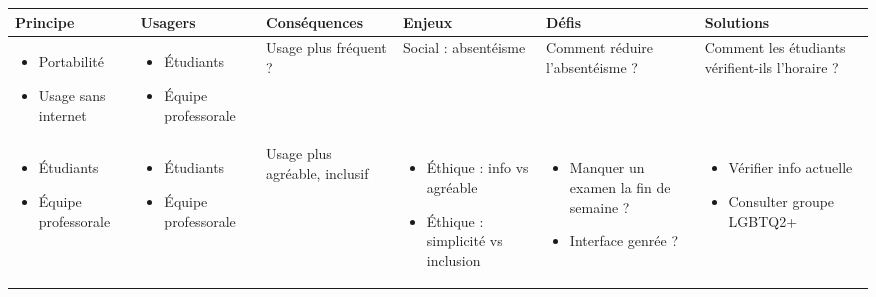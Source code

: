 \begin{tabular}{P{0.15\textwidth}P{0.15\textwidth}P{0.15\textwidth}P{0.15\textwidth}P{0.15\textwidth}P{0.15\textwidth}}
	\hline
	\bf Principe & \bf Usagers & \bf Conséquences & \bf Enjeux & \bf Défis & \bf Solutions \\
	\hline
	\hline
	\begin{itemize}
		\item Portabilité
		\item Usage sans internet
	\end{itemize}
	& \begin{itemize}
		\item Étudiants
		\item Équipe professorale
	\end{itemize}
	& Usage plus fréquent ?
	& Social : absentéisme
	& Comment réduire l'absentéisme ?
	& Comment les étudiants vérifient-ils l'horaire ?
	\\
	\begin{itemize}
		\item Étudiants
		\item Équipe professorale
	\end{itemize}
	& \begin{itemize}
		\item Étudiants
		\item Équipe professorale
	\end{itemize}
	& Usage plus agréable, inclusif
	& \begin{itemize}
		  \item Éthique : info vs agréable
		  \item Éthique : simplicité vs inclusion
	\end{itemize}
	& \begin{itemize}
		\item Manquer un examen la fin de semaine ?
		\item Interface genrée ?
	\end{itemize}
	& \begin{itemize}
		\item Vérifier info actuelle
		\item Consulter groupe LGBTQ2+
	\end{itemize}
	\\
	\hline
\end{tabular}